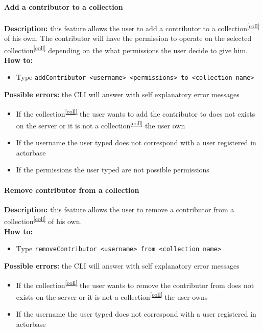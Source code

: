 \documentclass{scalatekids-article}
\begin{document}
\paragraph{Add a contributor to a collection}
\label{sec:addcontributor}
\textbf{Description:} this feature allows the user to add a contributor
to a collection\textsuperscript{\ref{coll}} of his own. The contributor will have the permission to operate on the selected collection\textsuperscript{\ref{coll}} depending on the what permissions the user decide to give him.\\
\textbf{How to:}
\begin{itemize}
\item Type \texttt{addContributor <username> <permissions> to <collection name>}
\end{itemize}
\textbf{Possible errors:} the CLI will answer with self explanatory error messages
\begin{itemize}
\item If the collection\textsuperscript{\ref{coll}} the user wants to add the contributor to does not exists on the server or it is not a collection\textsuperscript{\ref{coll}} the user own
\item If the username the user typed does not correspond with a user registered in actorbase
\item If the permissions the user typed are not possible permissions
\end{itemize}

\paragraph{Remove contributor from a collection}
\label{sec:removecontributor}
\textbf{Description:} this feature allows the user to remove a contributor from a collection\textsuperscript{\ref{coll}} of his own.\\
\textbf{How to:}
\begin{itemize}
\item Type \texttt{removeContributor <username> from <collection name>}
\end{itemize}
\textbf{Possible errors:} the CLI will answer with self explanatory error messages
\begin{itemize}
\item If the collection\textsuperscript{\ref{coll}} the user wants to remove the contributor from does not exists on the server or it is not a collection\textsuperscript{\ref{coll}} the user owns
\item If the username the user typed does not correspond with a user registered in actorbase
\end{itemize}
\end{document}
